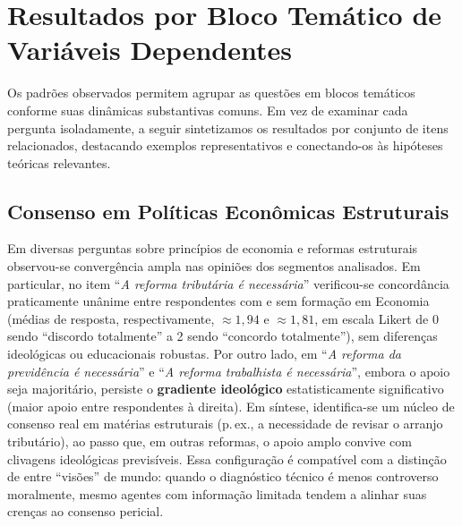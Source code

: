 \section{Resultados por Bloco Temático de Variáveis Dependentes}
Os padrões observados permitem agrupar as questões em blocos temáticos conforme suas dinâmicas substantivas comuns. Em vez de examinar cada pergunta isoladamente, a seguir sintetizamos os resultados por conjunto de itens relacionados, destacando exemplos representativos e conectando-os às hipóteses teóricas relevantes.

\subsection{Consenso em Políticas Econômicas Estruturais}
Em diversas perguntas sobre princípios de economia e reformas estruturais observou-se convergência ampla nas opiniões dos segmentos analisados. Em particular, no item ``\textit{A reforma tributária é necessária}'' verificou-se concordância praticamente unânime entre respondentes com e sem formação em Economia (médias de resposta, respectivamente, $\approx1{,}94$ e $\approx1{,}81$, em escala Likert de 0 sendo ``discordo totalmente'' a 2 sendo ``concordo totalmente''), sem diferenças ideológicas ou educacionais robustas. Por outro lado, em ``\textit{A reforma da previdência é necessária}'' e ``\textit{A reforma trabalhista é necessária}'', embora o apoio seja majoritário, persiste o \textbf{gradiente ideológico} estatisticamente significativo (maior apoio entre respondentes à direita). Em síntese, identifica-se um núcleo de consenso real em matérias estruturais (p.\,ex., a necessidade de revisar o arranjo tributário), ao passo que, em outras reformas, o apoio amplo convive com clivagens ideológicas previsíveis. Essa configuração é compatível com a distinção de \cite{sowell2007conflict} entre ``visões'' de mundo: quando o diagnóstico técnico é menos controverso moralmente, mesmo agentes com informação limitada tendem a alinhar suas crenças ao consenso pericial.

